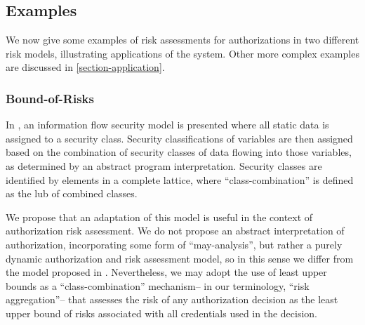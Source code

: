 \subsection{Examples}
\label{section-rtrexamples}

We now give some examples of risk assessments for authorizations in
two different risk models, illustrating applications of the system.
Other more complex examples are discussed in
\autoref{section-application}.

\subsubsection{Bound-of-Risks}  

In \cite{Den:latt}, an information flow security model is presented
where all static data is assigned to a security class.  Security
classifications of variables are then assigned based on the
combination of security classes of data flowing into those variables,
as determined by an abstract program interpretation.  Security classes
are identified by elements in a complete lattice, where
``class-combination'' is defined as the lub of combined classes.

We propose that an adaptation of this model is useful in the context
of authorization risk assessment.  We do not propose an abstract
interpretation of authorization, incorporating some form of
``may-analysis'', but rather a purely dynamic authorization and risk
assessment model, so in this sense we differ from the model proposed
in \cite{Den:latt}.  Nevertheless, we may adopt the use of least upper
bounds as a ``class-combination'' mechanism-- in our terminology,
``risk aggregation''-- that assesses the risk of any authorization
decision as the least upper bound of risks associated with all
credentials used in the decision.

